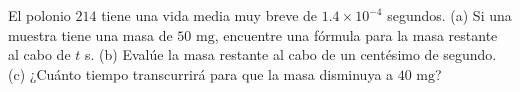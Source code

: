 \item El polonio $214$ tiene una vida media muy breve de $1.4 \times 10^{-4}$ segundos. (a) Si una muestra tiene una masa de $50 \text{ mg}$, encuentre una fórmula para la masa restante al cabo de $t$ s. (b) Evalúe la masa restante al cabo de un centésimo de segundo. (c) ¿Cuánto tiempo transcurrirá para que la masa disminuya a $40 \text{ mg}$?
